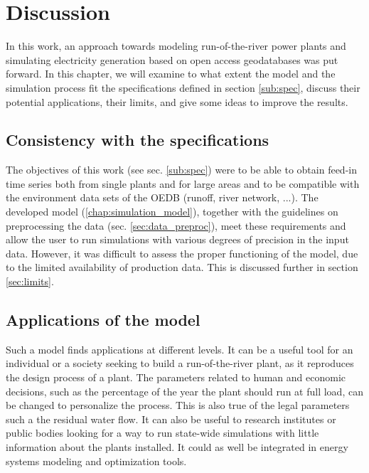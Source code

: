 \chapter{Discussion}
\label{chap:discussion}

In this work, an approach towards modeling run-of-the-river power plants and simulating electricity generation based on open access geodatabases was put forward. In this chapter, we will examine to what extent the model and the simulation process fit the specifications defined in section \ref{sub:spec}, discuss their potential applications, their limits, and give some ideas to improve the results.
\section{Consistency with the specifications}

The objectives of this work (see sec. \ref{sub:spec}) were to be able to obtain feed-in time series both from single plants and for large areas and to be compatible with the environment data sets of the OEDB (runoff, river network, ...). The developed model (\ref{chap:simulation_model}), together with the guidelines on preprocessing the data (sec. \ref{sec:data_preproc}), meet these requirements and allow the user to run simulations with various degrees of precision in the input data. However, it was difficult to assess the proper functioning of the model, due to the limited availability of production data. This is discussed further in section \ref{sec:limits}.

\section{Applications of the model}

Such a model finds applications at different levels. It can be a useful tool for an individual or a society seeking to build a run-of-the-river plant, as it reproduces the design process of a plant. The parameters related to human and economic decisions, such as the percentage of the year the plant should run at full load, can be changed to personalize the process. This is also true of the legal parameters such a the residual water flow. \newline
It can also be useful to research institutes or public bodies looking for a way to run state-wide simulations with little information about the plants installed. It could as well be integrated in energy systems modeling and optimization tools.

